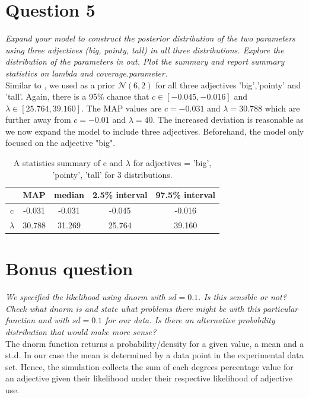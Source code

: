 \documentclass[11pt,a4paper,oneside]{article}
\begin{document}
\section{Question 5}
\label{Q5}
\textit{Expand your model to construct the posterior distribution of the two parameters using three adjectives (big, pointy, tall) in all three distributions. Explore the distribution of the parameters in \emph{out}. Plot the summary and report summary statistics on lambda and coverage.parameter.}\\

Similar to , we used as a prior $\mathcal{N}(6, 2)$ for all three adjectives 'big','pointy' and 'tall'. Again, there is a 95\% chance that $ c \in [-0.045, -0.016]$ and $\lambda \in [25.764, 39.160]$. The MAP values are $c = -0.031$ and $\lambda = 30.788$ which are further away from $c = -0.01$ and $\lambda = 40$. The increased deviation is reasonable as we now expand the model to include three adjectives. Beforehand, the model only focused on the adjective "big". 

\begin{table}[ht]
\centering
\begin{tabular}{ccccc}
  \hline
  & MAP & median & 2.5\% interval & 97.5\% interval\\ 
  \hline
    c & -0.031 & -0.031 & -0.045  & -0.016\\ 
    $\lambda$ & 30.788 & 31.269 & 25.764  & 39.160\\ 
   \hline
\end{tabular}
\caption{A statistics summary of c and $\lambda$ for adjectives = 'big', 'pointy', 'tall' for 3 distributions.}
\label{question_5}
\end{table}

\section{Bonus question}
\label{bonus}
\textit{We specified the likelihood using dnorm with $sd=0.1$. Is this sensible or not? Check what dnorm is and state what problems there might be with this particular function and with $sd=0.1$ for our data. Is there an alternative probability distribution that would make more sense?}\\

The dnorm function returns a probability/density for a given value, a mean and a st.d. In our case the mean is determined by a data point in the experimental data set. Hence, the simulation collects the sum of each degrees percentage value for an adjective given their likelihood under their respective likelihood of adjective use.
\end{document}
